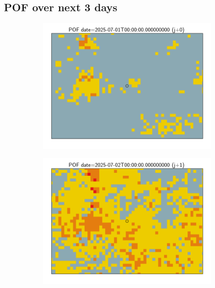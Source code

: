 \documentclass{article}
\begin{document}
\subsection*{POF over next 3 days}
\vspace{-1em}
\begin{figure}[H]
    \centering
    \begin{subfigure}[b]{0.31\textwidth}
        \centering
        \includegraphics[width=\linewidth]{pof_349_j0.png} %
    \end{subfigure}
    \begin{subfigure}[b]{0.31\textwidth}
        \centering
        \includegraphics[width=\linewidth]{pof_349_j1.png} %

\end{subfigure}
\end{figure}
\end{document}
